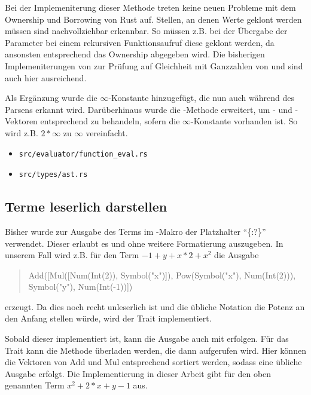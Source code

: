 \documentclass[11pt,a4paper, ngerman]{article}
\begin{document}
Bei der Implemeniterung dieser Methode treten keine neuen Probleme mit dem Ownership und Borrowing von Rust auf. Stellen, an denen Werte geklont werden müssen sind nachvollziehbar erkennbar. So müssen z.B. bei der Übergabe der Parameter bei einem rekursiven Funktionsaufruf diese geklont werden, da ansonsten entsprechend das Ownership abgegeben wird. Die bisherigen Implemeniterungen von  zur Prüfung auf Gleichheit mit Ganzzahlen von  und  sind auch hier ausreichend.

Als Ergänzung wurde die $\infty$-Konstante hinzugefügt, die nun auch während des Parsens erkannt wird. Darüberhinaus wurde die -Methode erweitert, um - und -Vektoren entsprechend zu behandeln, sofern die $\infty$-Konstante vorhanden ist. So wird z.B. $2*\infty$ zu $\infty$ vereinfacht.

\begin{itemize}
    \item \begin{verbatim}src/evaluator/function_eval.rs\end{verbatim}
    \item \begin{verbatim}src/types/ast.rs\end{verbatim}
\end{itemize}

\subsection{Terme leserlich darstellen}
Bisher wurde zur Ausgabe des Terms im -Makro der Platzhalter ``\{:?\}'' verwendet. Dieser erlaubt es  und  ohne weitere Formatierung auszugeben. In unserem Fall wird z.B. für den Term $-1+y+x*2+x^2$ die Ausgabe
\begin{quote}
    Add([Mul([Num(Int(2)), Symbol("x")]), Pow(Symbol("x"), Num(Int(2))), Symbol("y"), Num(Int(-1))])
\end{quote}
erzeugt. Da dies noch recht unleserlich ist und die übliche Notation die Potenz an den Anfang stellen würde, wird der Trait  implementiert.

Sobald dieser implementiert ist, kann die Ausgabe auch mit  erfolgen. Für das Trait kann die Methode  überladen werden, die dann aufgerufen wird. Hier können die Vektoren von Add und Mul entsprechend sortiert werden, sodass eine übliche Ausgabe erfolgt. Die Implementierung in dieser Arbeit gibt für den oben genannten Term $x^2+2*x+y-1$ aus.
\end{document}
